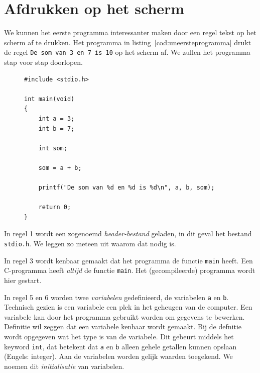 \section{Afdrukken op het scherm}
We kunnen het eerste programma interessanter maken door een regel tekst op het scherm af te drukken. Het programma in listing~\ref{cod:uneersteprogramma} drukt de regel \texttt{De som van 3 en 7 is 10} op het scherm af. We zullen het programma stap voor stap doorlopen.

\begin{figure}[!ht]
\begin{lstlisting}[caption=Afdrukken van de som van twee getallen.,label=cod:uneersteprogramma]
#include <stdio.h>

int main(void)
{
    int a = 3;
    int b = 7;

    int som;

    som = a + b;

	printf("De som van %d en %d is %d\n", a, b, som);

	return 0;
}
\end{lstlisting}
\end{figure}

In regel 1 wordt een zogenoemd \textsl{header-bestand} geladen, in dit geval het bestand \texttt{stdio.h}. We leggen zo meteen uit waarom dat nodig is.

In regel 3 wordt kenbaar gemaakt dat het programma de functie \texttt{main} heeft. Een C-programma heeft \textsl{altijd} de functie \texttt{main}. Het (gecompileerde) programma wordt hier gestart.

In regel 5 en 6 worden twee \textsl{variabelen} gedefinieerd, de variabelen \texttt{a} en \texttt{b}. Technisch gezien is een variabele een plek in het geheugen van de computer. Een variabele kan door het programma gebruikt worden om gegevens te bewerken. Definitie wil zeggen dat een variabele kenbaar wordt gemaakt. Bij de defnitie wordt opgegeven wat het type is van de variabele. Dit gebeurt middels het keyword \texttt{int}, dat betekent dat \texttt{a} en \texttt{b} alleen gehele getallen kunnen opslaan (Engels: integer). Aan de variabelen worden gelijk waarden toegekend. We noemen dit \textsl{initialisatie} van variabelen.


